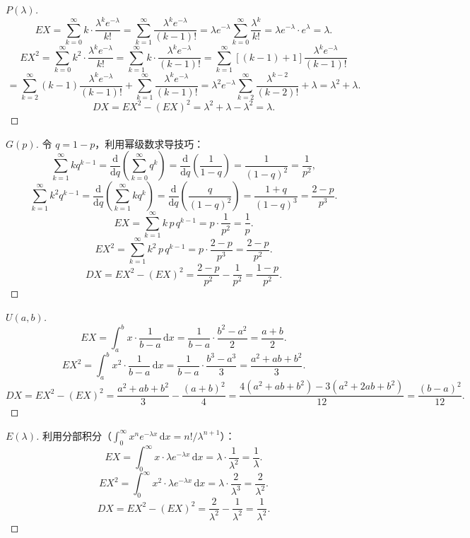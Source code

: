 \documentclass[lang=cn,11pt]{elegantbook}
\begin{document}
\begin{proof}[\(P(\lambda)\)]
\[EX = \sum_{k=0}^{\infty}k\cdot\frac{\lambda^k e^{-\lambda}}{k!} = \sum_{k=1}^{\infty}\frac{\lambda^k e^{-\lambda}}{(k-1)!} = \lambda e^{-\lambda}\sum_{k=0}^{\infty}\frac{\lambda^k}{k!} = \lambda e^{-\lambda}\cdot e^{\lambda} = \lambda.\]
\[EX^2 = \sum_{k=0}^{\infty}k^2\cdot\frac{\lambda^k e^{-\lambda}}{k!} = \sum_{k=1}^{\infty}k\cdot\frac{\lambda^k e^{-\lambda}}{(k-1)!} = \sum_{k=1}^{\infty}[(k-1)+1]\frac{\lambda^k e^{-\lambda}}{(k-1)!}\]
\[= \sum_{k=2}^{\infty}(k-1)\frac{\lambda^k e^{-\lambda}}{(k-1)!} + \sum_{k=1}^{\infty}\frac{\lambda^k e^{-\lambda}}{(k-1)!} = \lambda^2 e^{-\lambda}\sum_{k=2}^{\infty}\frac{\lambda^{k-2}}{(k-2)!} + \lambda = \lambda^2 + \lambda.\]
\[DX = EX^2 - (EX)^2 = \lambda^2 + \lambda - \lambda^2 = \lambda.\]
\end{proof}

\begin{proof}[\(G(p)\)]
令 \(q=1-p\)，利用幂级数求导技巧：
\[\sum_{k=1}^{\infty}kq^{k-1} = \frac{\mathrm{d}}{\mathrm{d}q}\!\left(\sum_{k=0}^{\infty}q^k\right) = \frac{\mathrm{d}}{\mathrm{d}q}\!\left(\frac{1}{1-q}\right) = \frac{1}{(1-q)^2} = \frac{1}{p^2},
\]
\[
\sum_{k=1}^{\infty}k^2 q^{k-1} = \frac{\mathrm{d}}{\mathrm{d}q}\!\left(\sum_{k=1}^{\infty}kq^k\right) = \frac{\mathrm{d}}{\mathrm{d}q}\!\left(\frac{q}{(1-q)^2}\right) = \frac{1+q}{(1-q)^3} = \frac{2-p}{p^3}.
\]
\[
EX = \sum_{k=1}^{\infty}k\,p\,q^{k-1} = p\cdot\frac{1}{p^2} = \frac{1}{p}.
\]
\[
EX^2 = \sum_{k=1}^{\infty}k^2\,p\,q^{k-1} = p\cdot\frac{2-p}{p^3} = \frac{2-p}{p^2}.
\]
\[
DX = EX^2 - (EX)^2 = \frac{2-p}{p^2} - \frac{1}{p^2} = \frac{1-p}{p^2}.
\]
\end{proof}

\begin{proof}[\(U(a,b)\)]
\[
EX = \int_a^b x\cdot\frac{1}{b-a}\,\mathrm{d}x = \frac{1}{b-a}\cdot\frac{b^2-a^2}{2} = \frac{a+b}{2}.
\]
\[
EX^2 = \int_a^b x^2\cdot\frac{1}{b-a}\,\mathrm{d}x = \frac{1}{b-a}\cdot\frac{b^3-a^3}{3} = \frac{a^2+ab+b^2}{3}.
\]
\[
DX = EX^2 - (EX)^2 = \frac{a^2+ab+b^2}{3} - \frac{(a+b)^2}{4} = \frac{4(a^2+ab+b^2)-3(a^2+2ab+b^2)}{12} = \frac{(b-a)^2}{12}.
\]
\end{proof}

\begin{proof}[\(E(\lambda)\)]
利用分部积分（\(\int_0^\infty x^n e^{-\lambda x}\,\mathrm{d}x = n!/\lambda^{n+1}\)）：
\[
EX = \int_0^\infty x\cdot\lambda e^{-\lambda x}\,\mathrm{d}x = \lambda\cdot\frac{1}{\lambda^2} = \frac{1}{\lambda}.
\]
\[
EX^2 = \int_0^\infty x^2\cdot\lambda e^{-\lambda x}\,\mathrm{d}x = \lambda\cdot\frac{2}{\lambda^3} = \frac{2}{\lambda^2}.
\]
\[
DX = EX^2 - (EX)^2 = \frac{2}{\lambda^2} - \frac{1}{\lambda^2} = \frac{1}{\lambda^2}.
\]
\end{proof}
\end{document}
